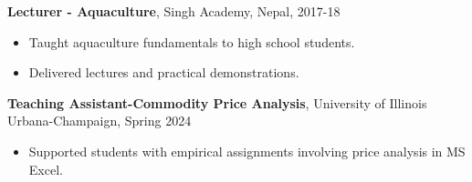 \textbf{Lecturer - Aquaculture}, Singh Academy, Nepal, 2017-18

\begin{itemize}
    \item Taught aquaculture fundamentals to high school students.
    \item Delivered lectures and practical demonstrations.
\end{itemize}
\textbf{Teaching Assistant-Commodity Price Analysis}, University of Illinois Urbana-Champaign,  Spring 2024
\begin{itemize}
    \item Supported students with empirical assignments involving price analysis in MS Excel.
\end{itemize}


